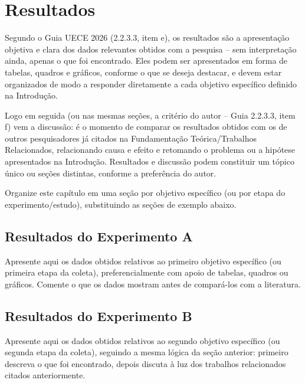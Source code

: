\chapter{Resultados}
\label{chap:resultados}

Segundo o Guia UECE 2026 (2.2.3.3, item e), os resultados são a apresentação objetiva e clara dos dados relevantes obtidos com a pesquisa -- sem interpretação ainda, apenas o que foi encontrado. Eles podem ser apresentados em forma de tabelas, quadros e gráficos, conforme o que se deseja destacar, e devem estar organizados de modo a responder diretamente a cada objetivo específico definido na Introdução.

Logo em seguida (ou nas mesmas seções, a critério do autor -- Guia 2.2.3.3, item f) vem a discussão: é o momento de comparar os resultados obtidos com os de outros pesquisadores já citados na Fundamentação Teórica/Trabalhos Relacionados, relacionando causa e efeito e retomando o problema ou a hipótese apresentados na Introdução. Resultados e discussão podem constituir um tópico único ou seções distintas, conforme a preferência do autor.

Organize este capítulo em uma seção por objetivo específico (ou por etapa do experimento/estudo), substituindo as seções de exemplo abaixo.

\section{Resultados do Experimento A}
\label{sec:resultados-do-experimento-a}

Apresente aqui os dados obtidos relativos ao primeiro objetivo específico (ou primeira etapa da coleta), preferencialmente com apoio de tabelas, quadros ou gráficos. Comente o que os dados mostram antes de compará-los com a literatura.

\section{Resultados do Experimento B}
\label{sec:resultados-do-experimento-b}

Apresente aqui os dados obtidos relativos ao segundo objetivo específico (ou segunda etapa da coleta), seguindo a mesma lógica da seção anterior: primeiro descreva o que foi encontrado, depois discuta à luz dos trabalhos relacionados citados anteriormente.
